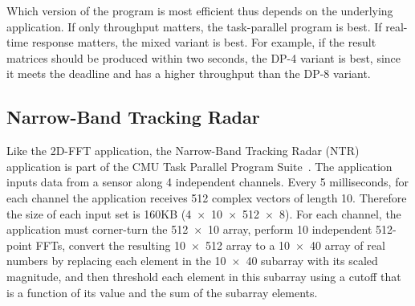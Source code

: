 \documentclass{acmtrans2e}
\begin{document}
Which version of the program is most efficient thus depends on the
underlying application. If only throughput matters, the task-parallel
program is best. If real-time response matters, the mixed variant
is best.
For example, if the result matrices should
be produced within two seconds, the DP-4 variant is best, since it
meets the deadline and has a higher throughput than the DP-8
variant.


\subsection{Narrow-Band Tracking Radar}

Like the 2D-FFT application, the Narrow-Band Tracking Radar (NTR) application
is part of the CMU Task Parallel Program Suite~\cite{dinda94}.
The application inputs data from a sensor along 4 independent channels.
Every 5 milliseconds,
for each channel the application receives 512 complex vectors of length 10.
Therefore the size of each input set is 160KB
(4~$\times$~10~$\times$~512~$\times$~8).
For each channel, the application must corner-turn the 512~$\times$~10 array,
perform 10 independent 512-point FFTs,
convert the resulting 10~$\times$~512 array to a 10~$\times$~40 array of real
numbers by replacing each element in the 10~$\times$~40 subarray
with its scaled magnitude, and then threshold each element in this subarray
using a cutoff that is a function of its value and the sum of the subarray
elements.
\end{document}
